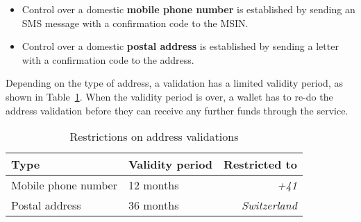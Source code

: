 \begin{itemize}
\item Control over a domestic {\bf mobile phone number} is established
  by sending an SMS message with a confirmation code to the MSIN.
\item Control over a domestic {\bf postal address} is established by
  sending a letter with a confirmation code to the address.
\end{itemize}

Depending on the type of address, a validation has a limited validity period,
as shown in Table~\ref{table:proc:domestic}.  When the validity period is
over, a wallet has to re-do the address validation before they can receive any
further funds through the service.

\begin{table}[h!]
  \caption{Restrictions on address validations}
  \label{table:proc:domestic}
  \begin{tabular}{l|l|r}
    {\bf Type}          & {\bf Validity period} & {\bf Restricted to} \\ \hline \hline
    Mobile phone number & 12 months             & {\em +41} \\
    Postal address      & 36 months             & {\em Switzerland} \\
  \end{tabular}
\end{table}
